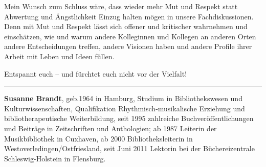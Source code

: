 \documentclass[a4paper,
fontsize=11pt,
oneside,
numbers=noperiodatend,
parskip=half-,
bibliography=totoc,
final
]{scrartcl}
\begin{document}
Mein Wunsch zum Schluss wäre, dass wieder mehr Mut und Respekt statt
Abwertung und Ängstlichkeit Einzug halten mögen in unsere
Fachdiskussionen. Denn mit Mut und Respekt lässt sich offener und
kritischer wahrnehmen und einschätzen, wie und warum andere Kolleginnen
und Kollegen an anderen Orten andere Entscheidungen treffen, andere
Visionen haben und andere Profile ihrer Arbeit mit Leben und Ideen
füllen.

Entspannt euch -- und fürchtet euch nicht vor der Vielfalt!

\begin{center}\rule{0.5\linewidth}{\linethickness}\end{center}

\textbf{Susanne Brandt}, geb.1964 in Hamburg, Studium in
Bibliothekswesen und Kulturwissenschaften, Qualifikation
Rhythmisch-musikalische Erziehung und bibliotherapeutische
Weiterbildung, seit 1995 zahlreiche Buchveröffentlichungen und Beiträge
in Zeitschriften und Anthologien; ab 1987 Leiterin der Musikbibliothek
in Cuxhaven, ab 2000 Bibliotheksleiterin in
Westoverledingen/Ostfriesland, seit Juni 2011 Lektorin bei der
Büchereizentrale Schleswig-Holstein in Flensburg.
\end{document}
